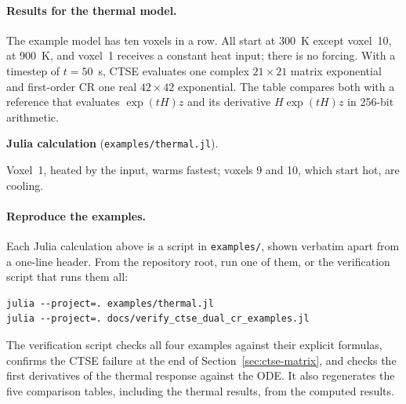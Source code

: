 \documentclass[11pt]{article}
\newcommand{\juliascript}[1]{\par\medskip\needspace{6\baselineskip}\noindent
  \textbf{Julia calculation} (\nolinkurl{examples/#1}).\par
  }
\begin{document}
\paragraph{Results for the thermal model.}
The example model has ten voxels in a row. All start at 300~K except
voxel~10, at 900~K, and voxel~1 receives a constant heat input; there is no
forcing. With a timestep of $t=50$~s, CTSE evaluates one complex
$21\times21$ matrix exponential and first-order CR one real $42\times42$
exponential. The table compares both with a reference that evaluates
$\exp(tH)z$ and its derivative $H\exp(tH)z$ in 256-bit arithmetic.
\juliascript{thermal.jl}
%
Voxel~1, heated by the input, warms fastest; voxels 9 and 10, which start
hot, are cooling.

\paragraph{Reproduce the examples.}
Each Julia calculation above is a script in \texttt{examples/}, shown verbatim
apart from a one-line header. From the repository root, run one of them, or the
verification script that runs them all:
\begin{lstlisting}
julia --project=. examples/thermal.jl
julia --project=. docs/verify_ctse_dual_cr_examples.jl
\end{lstlisting}
The verification script checks all four examples against their explicit
formulas, confirms the CTSE failure at the end of
Section~\ref{sec:ctse-matrix}, and checks the first derivatives of the thermal
response against the ODE. It also regenerates the five comparison tables,
including the thermal results, from the computed results.
\end{document}
